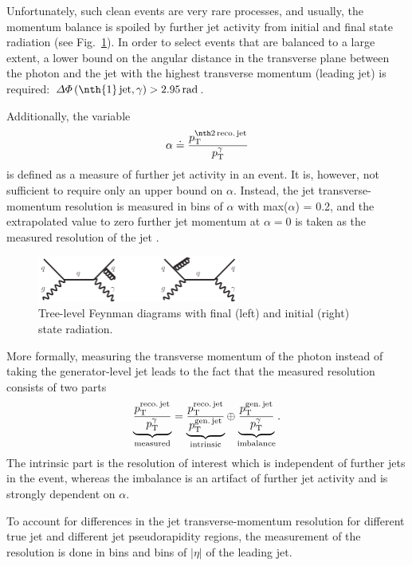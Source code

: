 Unfortunately, such clean events are very rare processes, and usually, the momentum balance is spoiled by further jet activity from initial and final state radiation (see Fig.~\ref{res:fig:FeynmanDiagramsWithRadiation}). 
In order to select events that are balanced to a large extent, a lower bound on the angular distance in the transverse plane between the photon and the jet with the highest transverse momentum (leading jet) is required: $\Delta\Phi \left(\text{\nth{1}\,jet,\,} \gamma \right)>2.95\,\unit{rad}$. 

Additionally, the variable 
\begin{equation*}
\label{res:eq:alphaDef}
\alpha \doteq \frac{\ptsecondrecojet}{\ptgamma}
\end{equation*} 
is defined as a measure of further jet activity in an event. 
It is, however, not sufficient to require only an upper bound on $\alpha$. 
Instead, the jet transverse-momentum resolution is measured in bins of $\alpha$ with max($\alpha$) = 0.2, 
and the extrapolated value to zero further jet momentum at $\alpha=0$ is taken as the measured resolution of the jet \pt. %
\begin{figure}[t]
  \centering
      \includegraphics[width=0.60\textwidth]{figures/resolution/generalApproach/FeynmanDiagramsWithRadiation.pdf}
  \caption{Tree-level Feynman diagrams with final (left) and initial (right) state radiation.}  
  \label{res:fig:FeynmanDiagramsWithRadiation}
\end{figure}

More formally, measuring the transverse momentum of the photon instead of taking the generator-level jet \pt leads to the fact that the measured resolution consists of two parts
\begin{equation*}\label{res:eq:splitting}
\underbrace{\frac{{p}_\mathrm{T}^{\text{reco.\,jet}}}{{p}_\mathrm{T}^{\gamma}}}_{\text{measured}} = \underbrace{\frac{{p}_\mathrm{T}^{\text{reco.\,jet}}}{{p}_\mathrm{T}^{\text{gen.\,jet}}}}_{\text{intrinsic}} \oplus \underbrace{\frac{{p}_\mathrm{T}^{\text{gen.\,jet}}}{{p}_\mathrm{T}^{\gamma}}}_{\text{imbalance}}.
\end{equation*}
The intrinsic part is the resolution of interest which is independent of further jets in the event, whereas the imbalance is an artifact of further jet activity and is strongly dependent on $\alpha$.


To account for differences in the jet transverse-momentum resolution for different true jet \pt and different jet pseudorapidity regions, the measurement of the resolution is done in \ptgamma bins and bins of $|\eta|$ of the leading jet.

